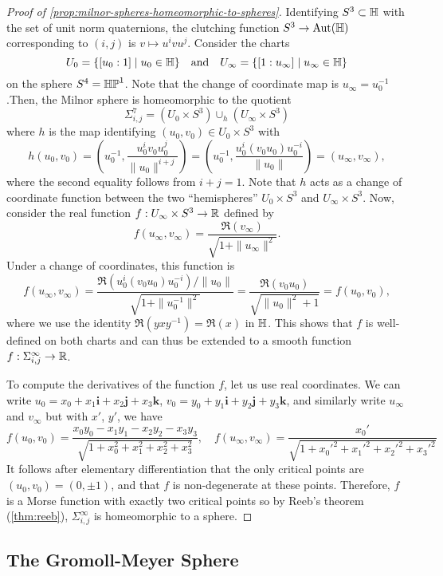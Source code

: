 \begin{proof}[Proof of \cref{prop:milnor-spheres-homeomorphic-to-spheres}]
	Identifying $S^3\subset \mathbb{H}$ with the set of unit norm quaternions, the clutching function $S^3 \to \operatorname{Aut}(\mathbb{H})$ corresponding to $(i,j)$ is $v\mapsto u^ivu^j$. Consider the charts
	\[
		U_0 = \{ [u_0:1] \mid u_0\in \mathbb{H}\}\quad\textrm{and}\quad U_\infty = \{ [1:u_\infty] \mid u_\infty\in \mathbb{H}\}
	\]
	on the sphere $S^4=\mathbb{HP}^1$. Note that the change of coordinate map is $u_\infty=u_0^{-1}$.Then, the Milnor sphere is homeomorphic to the quotient
	\[
	\Sigma^7_{i,j} = (U_0 \times S^3)\cup_h (U_\infty\times S^3)
	\]
	where $h$ is the map identifying $(u_0,v_0)\in U_0\times S^3$ with
	\[
		h(u_0,v_0)= \left(u_0^{-1}, \frac{u_0^iv_0u_0^j}{\|u_0\|^{i+j}}\right) = \left(u_0^{-1}, \frac{u_0^i (v_0u_0) u_0^{-i}}{\|u_0\|}\right) = (u_\infty, v_\infty),
	\]
	where the second equality follows from $i+j=1$.
	Note that $h$ acts as a change of coordinate function between the two ``hemispheres'' $U_0\times S^3$ and $U_\infty\times S^3$.
	Now, consider the real function $f : U_\infty\times S^3\to \mathbb{R}$ defined by
	\[
		f(u_\infty, v_\infty) = \frac{\Re(v_\infty)}{\sqrt{1+\|u_\infty\|^2}}.
	\]
	Under a change of coordinates, this function is
	\[
		f(u_\infty, v_\infty) = \frac{\Re(u_0^i(v_0u_0)u_0^{-i})/\|u_0\|}{\sqrt{1+\|u_0^{-1}\|^2}} = \frac{\Re(v_0u_0)}{\sqrt{\|u_0\|^2+1}}=f(u_0,v_0),
	\]
	where we use the identity $\Re(yxy^{-1})=\Re(x)$ in $\mathbb{H}$. This shows that $f$ is well-defined on both charts and can thus be extended to a smooth function $f : \Sigma^\infty_{i,j} \to \mathbb{R}$.

	To compute the derivatives of the function $f$, let us use real coordinates. We can write $u_0=x_0+x_1\bm{i}+x_2\bm{j}+x_3\bm{k}$, $v_0 = y_0+y_1\bm{i}+y_2\bm{j}+y_3\bm{k}$, and similarly write $u_\infty$ and $v_\infty$ but with $x'$, $y'$, we have 
	\[
		f(u_0, v_0) = \frac{x_0y_0 - x_1y_1 - x_2y_2 - x_3y_3}{\sqrt{1+x_0^2+x_1^2+x_2^2+x_3^2}},\quad
		f(u_\infty, v_\infty) = \frac{x_0'}{\sqrt{1+x_0'^2+x_1'^2+x_2'^2+x_3'^2}}
	\]
	It follows after elementary differentiation that the only critical points are $(u_0, v_0)= (0,\pm 1)$, and that $f$ is non-degenerate at these points. Therefore, $f$ is a Morse function with exactly two critical points so by Reeb's theorem (\ref{thm:reeb}), $\Sigma_{i,j}^\infty$ is homeomorphic to a sphere.
\end{proof}

\subsection{The Gromoll-Meyer Sphere}\label{sec:gromoll-meyer}


